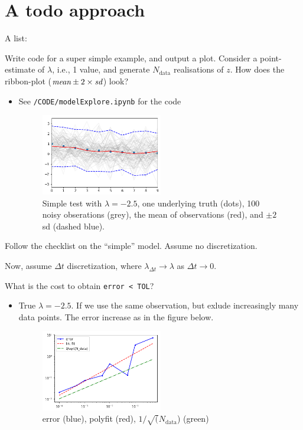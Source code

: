 \documentclass{amsart}
\numberwithin{equation}{section}
\numberwithin{table}{section}
\numberwithin{figure}{section}
\theoremstyle{plain}
\theoremstyle{definition}
\theoremstyle{remark}
\newcommand{\cmark}{\ding{51}}%
\newcommand{\done}{\rlap{$\square$}{\raisebox{2pt}{\large\hspace{1pt}\cmark}}%
  \hspace{-2.5pt}}
\begin{document}
\section{A todo approach}
A list:
\begin{todolist}
\item[\done] Write code for a super simple example, and output a
  plot. Consider a point-estimate of $\lambda$, i.e., 1 value, and
  generate $N_{\text{data}}$ realisations of $z$. How does the
  ribbon-plot ($\text{{\it mean}} \pm 2 \times \text{{\it sd}}$) look?
  \begin{itemize}
  \item See \verb;/CODE/modelExplore.ipynb; for the code

    \begin{figure}[H]
      \centering
      \includegraphics[width=0.5\textwidth]{CODE/ribbon.png}
      \caption{Simple test with $\lambda = -2.5$, one underlying truth
        (dots), 100 noisy obserations (grey), the mean of observations
        (red), and $\pm 2$ sd (dashed blue).}
    \end{figure}
  \end{itemize}


\item Follow the checklist on the ``simple'' model. Assume no discretization.
\item Now, assume $\Delta t$ discretization, where
  $\lambda_{\Delta t} \rightarrow \lambda$ as $\Delta t \rightarrow 0$.
\item What is the cost to obtain \verb;error < TOL;?
  \begin{itemize}
  \item True $\lambda = -2.5$. If we use the same observation, but
    exlude increasingly many data points. The error increase as in the figure below.
    \begin{figure}[H]
      \centering
      \includegraphics[width=0.5\textwidth]{CODE/errorplot.png}
      \caption{error (blue), polyfit (red), $1/\sqrt(N_{\text{data}}$) (green)}
    \end{figure}


\end{itemize}
\end{todolist}
\end{document}
